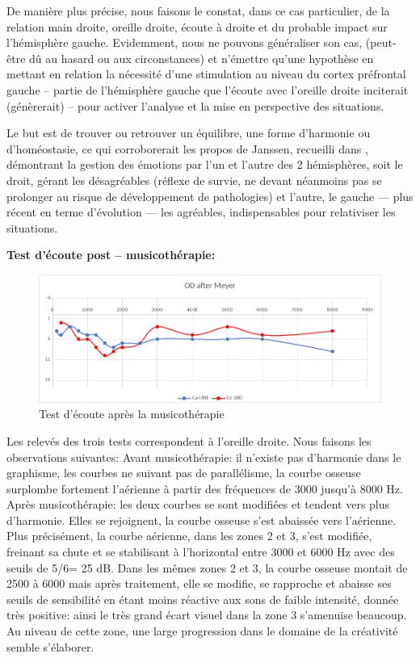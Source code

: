 De manière plus précise, nous faisons le constat, dans ce cas
particulier,  de la relation main droite, oreille droite, écoute
à droite et du probable impact sur l'hémisphère gauche.
Evidemment, nous ne pouvons généraliser son cas, (peut-être dû au hasard ou aux circonstances) et 
n'émettre qu'une hypothèse
en mettant en relation la nécessité d'une stimulation au niveau du cortex préfrontal
gauche -- partie de l'hémisphère gauche que l'écoute avec
l'oreille droite inciterait (génèrerait) -- pour activer l'analyse et la
mise en perspective des situations.

Le but est de trouver ou
retrouver un équilibre, une forme d'harmonie ou d'homéostasie, ce qui corroborerait les
propos de Janssen, recueilli dans  \autocite{van_eersel_votre_2012 }, démontrant la gestion des 
émotions par
l'un et l'autre des 2 hémisphères, soit le droit,  gérant les désagréables
(réflexe de survie, ne devant néanmoins pas se prolonger au risque de
développement de pathologies)
et l'autre, le gauche --- plus récent en terme d'évolution ---  les
agréables, indispensables pour relativiser les situations.

\textbf{ Test d'écoute post -- musicothérapie:}



\begin{figure}[h]
	\centering
	
	\includegraphics[width=1\linewidth]{images/clinique/od_after_meyer.png}
	\caption{Test d'écoute après la musicothérapie}
	\label{fig:odaftermeyer}
\end{figure}
Les relevés des trois tests correspondent à l'oreille droite.
Nous faisons les observations suivantes:
Avant musicothérapie: il n'existe pas d'harmonie dans le graphisme, les courbes ne suivant pas de 
parallélisme, la courbe osseuse  surplombe fortement l'aérienne 
à partir des fréquences de 3000 jusqu'à 8000 Hz.
Après musicothérapie:  les deux courbes se sont modifiées et tendent vers plus d'harmonie.
Elles se rejoignent, la courbe osseuse s'est abaissée vers l'aérienne.
 Plus précisément, la courbe aérienne, dans les
zones 2 et 3,  s'est modifiée, freinant sa
chute et se stabilisant à l'horizontal entre 3000 et 6000 Hz
avec des seuils de 5/6= 25 dB.
Dans les mêmes zones 2 et 3, la
courbe osseuse montait de 2500 à 6000 mais après traitement,
elle se modifie, se rapproche et abaisse ses seuils de
sensibilité en étant moins réactive aux sons de faible
intensité, donnée très positive: ainsi le très grand écart visuel dans la zone 3 s'amenuise beaucoup. Au 
niveau de cette
zone, une large progression dans
le domaine de la créativité semble s'élaborer. 

